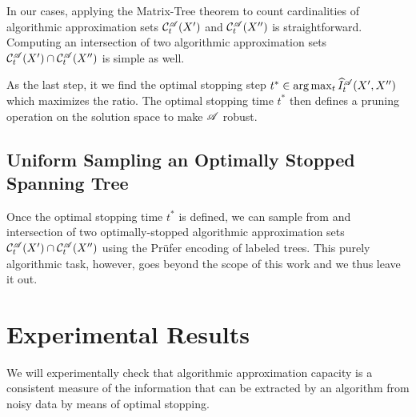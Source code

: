 
In our cases, applying the Matrix-Tree theorem to count cardinalities of algorithmic
approximation sets  ${{\cal C}}^{\mathscr{A}}_{t}(X')$ and
${{\cal C}}^{\mathscr{A}}_{t}(X'')$ is straightforward. Computing an intersection of two
algorithmic approximation sets ${{\cal C}}^{\mathscr{A}}_{t}(X') \cap
{{\cal C}}^{\mathscr{A}}_{t}(X'')$ is simple as well.

As the last step, it we find the optimal stopping step $t^* \in
\arg\max_t
\widehat I^{\mathscr{A}}_t( X', X'' )$ which maximizes the
ratio. The optimal stopping time $t^*$ then defines a
pruning operation on the solution space to make $\mathscr{A}$ robust.

\subsection{Uniform Sampling an Optimally Stopped Spanning Tree}

Once the optimal stopping time $t^*$ is defined, we can sample from 
and intersection of two optimally-stopped algorithmic approximation sets 
${{\cal C}}^{\mathscr{A}}_{t}(X') \cap {{\cal C}}^{\mathscr{A}}_{t}(X'')$ using the Pr\"ufer encoding of
labeled trees. This purely algorithmic task, however, goes beyond the scope 
of this work and we thus leave it out.

\section{Experimental Results} 
\label{sec:mst_results}
We will experimentally check that algorithmic approximation capacity is a consistent
measure of the information that can be extracted by an algorithm from
noisy data by means of optimal stopping.

